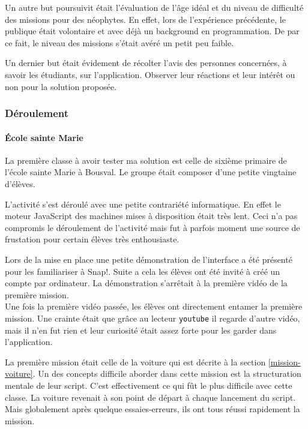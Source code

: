 Un autre but poursuivit était l'évaluation de l'âge idéal et du niveau de difficulté des missions pour des néophytes. En effet, lors de l'expérience précédente, le publique était volontaire et avec déjà un background en programmation. De par ce fait, le niveau des missions s'était avéré un petit peu faible.

Un dernier but était évidement de récolter l'avis des personnes concernées, à savoir les étudiants, sur l'application. Observer leur réactions et leur intérêt ou non pour la solution proposée.

\subsubsection{Déroulement}
\paragraph{École sainte Marie} La première classe à avoir tester ma solution est celle de sixième primaire de l'école sainte Marie à Bousval. Le groupe était composer d'une petite vingtaine d'élèves.

L'activité s'est déroulé avec une petite contrariété informatique. En effet le moteur JavaScript des machines mises à disposition était très lent. Ceci n'a pas compromis le déroulement de l'activité mais fut à parfois moment une source de frustation pour certain élèves très enthousiaste.

Lors de la mise en place une petite démonstration de l'interface a été présenté pour les familiariser à Snap!. Suite a cela les élèves ont été invité à créé un compte par ordinateur. La démonstration s'arrêtait à la première vidéo de la première mission.\\

Une fois la première vidéo passée, les élèves ont directement entamer la première mission. Une crainte était que grâce au lecteur \texttt{youtube} il regarde d'autre vidéo, mais il n'en fut rien et leur curiosité était assez forte pour les garder dans l'application.

La première mission était celle de la voiture qui est décrite à la section \ref{mission-voiture}. Un des concepts difficile aborder dans cette mission est la structuration mentale de leur script. C'est effectivement ce qui fût le plus difficile avec cette classe. La voiture revenait à son point de départ à chaque lancement du script. Mais globalement après quelque essaies-erreurs, ils ont tous réussi rapidement la mission.\\

